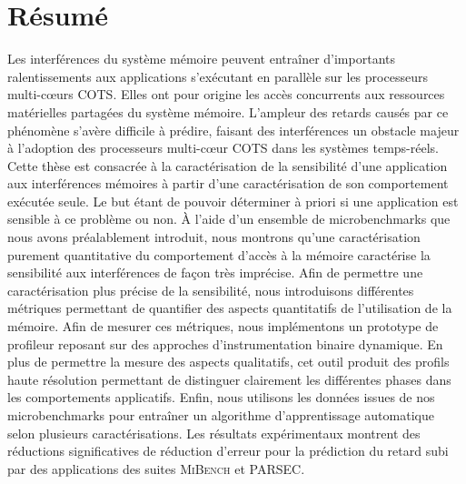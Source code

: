 \chapter{Résumé}


Les interférences du système mémoire peuvent entraîner d'importants ralentissements aux applications s'exécutant en parallèle sur les processeurs multi-cœurs COTS.
Elles ont pour origine les accès concurrents aux ressources matérielles partagées du système mémoire.
L'ampleur des retards causés par ce phénomène s'avère difficile à prédire, faisant des interférences un obstacle majeur à l'adoption des processeurs multi-cœur COTS dans les systèmes temps-réels.
Cette thèse est consacrée à la caractérisation de la sensibilité d'une application aux interférences mémoires à partir d'une caractérisation de son comportement exécutée seule.
Le but étant de pouvoir déterminer à priori si une application est sensible à ce problème ou non.
À l'aide d'un ensemble de microbenchmarks que nous avons préalablement introduit, nous montrons qu'une caractérisation purement quantitative du comportement d'accès à la mémoire caractérise la sensibilité aux interférences de façon très imprécise.
Afin de permettre une caractérisation plus précise de la sensibilité, nous introduisons différentes métriques permettant de quantifier des aspects quantitatifs de l'utilisation de la mémoire.
Afin de mesurer ces métriques, nous implémentons un prototype de profileur reposant sur des approches d'instrumentation binaire dynamique.
En plus de permettre la mesure des aspects qualitatifs, cet outil produit des profils haute résolution permettant de distinguer clairement les différentes phases dans les comportements applicatifs.
Enfin, nous utilisons les données issues de nos microbenchmarks pour entraîner un algorithme d'apprentissage automatique selon plusieurs caractérisations.
Les résultats expérimentaux montrent des réductions significatives de réduction d'erreur pour la prédiction du retard subi par des applications des suites \textsc{MiBench} et \textsc{PARSEC}.